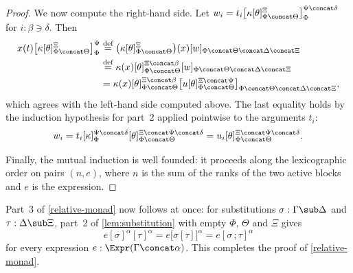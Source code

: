 \begin{proof}
    We now compute the right-hand side. Let $w_i = t_i\big[\kappa[\theta]_{\Phi \concat \Theta}^{\Xi}\big]_\Phi^{\Psi \concat \delta}$ for $i : \beta \ni \delta$. Then
    \begin{align*}
        x(t)\big[\kappa[\theta]_{\Phi \concat \Theta}^{\Xi}\big]_\Phi^\Psi
        &\overset{\textnormal{def}}{=} \big(\kappa[\theta]_{\Phi \concat \Theta}^{\Xi}\big)(x)[w]_{\Phi \concat \Theta \concat \Delta \concat \Xi}\\
        &\overset{\textnormal{def}}{=} \kappa(x)[\theta]_{\Phi \concat \Theta}^{\Xi \concat \beta}[w]_{\Phi \concat \Theta \concat \Delta \concat \Xi}\\
        &= \kappa(x)[\theta]_{\Phi \concat \Theta}^{\Xi \concat \beta}\big[u[\theta]_{\Phi \concat \Theta}^{\Xi \concat \Psi}\big]_{\Phi \concat \Theta \concat \Delta \concat \Xi},
    \end{align*}
    which agrees with the left-hand side computed above. The last equality holds by the induction hypothesis for part~2 applied pointwise to the arguments $t_i$:
    \[
    w_i = t_i[\kappa]_\Phi^{\Psi \concat \delta}[\theta]_{\Phi \concat \Theta}^{\Xi \concat \Psi \concat \delta} = u_i[\theta]_{\Phi \concat \Theta}^{\Xi \concat \Psi \concat \delta}.
    \]

    Finally, the mutual induction is well founded: it proceeds along the lexicographic order on pairs $(n, e)$, where $n$ is the sum of the ranks of the two active blocks and $e$ is the expression.
\end{proof}

Part~3 of \cref{relative-monad} now follows at once: for substitutions $\sigma : \Gamma \sub \Delta$ and $\tau : \Delta \sub \Xi$, part~2 of \cref{lem:substitution} with empty $\Phi$, $\Theta$ and $\Xi$ gives
\[
e[\sigma]^\alpha[\tau]^\alpha = e\big[\sigma[\tau]\big]^\alpha = e[\sigma \,; \tau]^\alpha
\]
for every expression $e : \Expr(\Gamma \concat \alpha)$. This completes the proof of \cref{relative-monad}.

